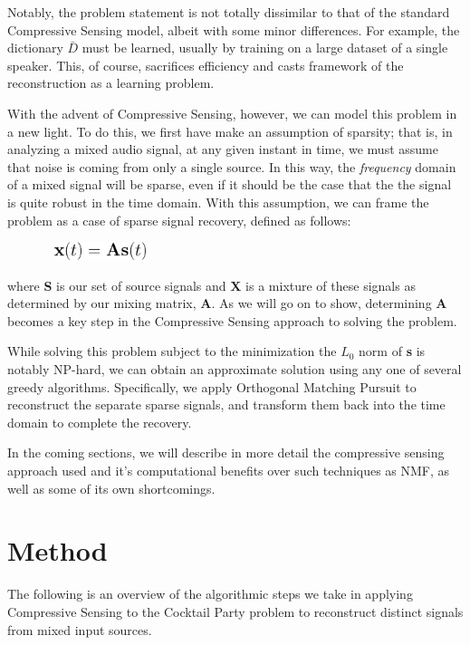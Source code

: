 \documentclass{article}
\begin{document}
Notably, the problem statement is not totally dissimilar to that of the standard Compressive Sensing model, albeit with some minor differences. For example, the dictionary $\bar{D}$ must be learned, usually by training on a large dataset of a single speaker. This, of course, sacrifices efficiency and casts framework of the reconstruction as a learning problem.  

With the advent of Compressive Sensing, however, we can model this problem in a new light. To do this, we first have make an assumption of sparsity; that is, in analyzing a mixed audio signal, at any given instant in time, we must assume that noise is coming from only a single source. In this way, the {\it frequency} domain of a mixed signal will be sparse, even if it should be the case that the the signal is quite robust in the time domain. With this assumption, we can frame the problem as a case of sparse signal recovery, defined as follows:

\begin{figure}[h!]
	\centering
	\includegraphics[width=94pt, height=15pt]{compressive.png}
	\label{Compressive Sensing Problem Statement}
\end{figure}

where \textbf{S} is our set of source signals and \textbf{X} is a mixture of these signals as determined by our mixing matrix, \textbf{A}. As we will go on to show, determining \textbf{A} becomes a key step in the Compressive Sensing approach to solving the problem.

While solving this problem subject to the minimization the $L_{0}$ norm of \textbf{s} is notably NP-hard, we can obtain an approximate solution using any one of several greedy algorithms. Specifically, we apply Orthogonal Matching Pursuit to reconstruct the separate sparse signals, and transform them back into the time domain to complete the recovery.

In the coming sections, we will describe in more detail the compressive sensing approach used and it's computational benefits over such techniques as NMF, as well as some of its own shortcomings.


\section{Method}
The following is an overview of the algorithmic steps we take in applying Compressive Sensing to the Cocktail Party problem to reconstruct distinct signals from mixed input sources.
\end{document}
